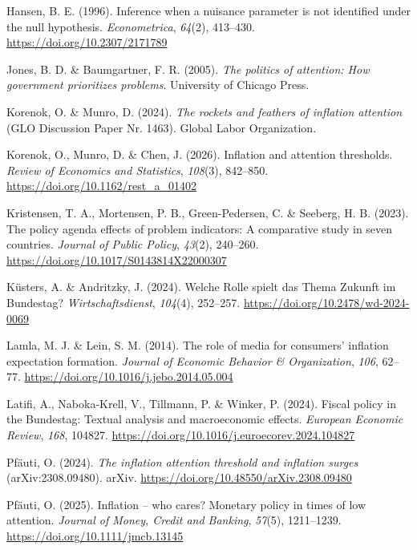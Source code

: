 \documentclass[11pt,a4paper]{article}
\newenvironment{literatur}{\begin{list}{}{\setlength{\leftmargin}{1.5em}\setlength{\itemindent}{-1.5em}\setlength{\itemsep}{0.35em}\small}\raggedright}{\end{list}}
\begin{document}
\begin{literatur}
\item Hansen, B. E. (1996). Inference when a nuisance parameter is not identified under the null hypothesis. \emph{Econometrica}, \emph{64}(2), 413--430. \url{https://doi.org/10.2307/2171789}

\item Jones, B. D. \& Baumgartner, F. R. (2005). \emph{The politics of attention: How government prioritizes problems}. University of Chicago Press.

\item Korenok, O. \& Munro, D. (2024). \emph{The rockets and feathers of inflation attention} (GLO Discussion Paper Nr. 1463). Global Labor Organization.

\item Korenok, O., Munro, D. \& Chen, J. (2026). Inflation and attention thresholds. \emph{Review of Economics and Statistics}, \emph{108}(3), 842--850. \url{https://doi.org/10.1162/rest\_a\_01402}

\item Kristensen, T. A., Mortensen, P. B., Green-Pedersen, C. \& Seeberg, H. B. (2023). The policy agenda effects of problem indicators: A comparative study in seven countries. \emph{Journal of Public Policy}, \emph{43}(2), 240--260. \url{https://doi.org/10.1017/S0143814X22000307}

\item Küsters, A. \& Andritzky, J. (2024). Welche Rolle spielt das Thema Zukunft im Bundestag? \emph{Wirtschaftsdienst}, \emph{104}(4), 252--257. \url{https://doi.org/10.2478/wd-2024-0069}

\item Lamla, M. J. \& Lein, S. M. (2014). The role of media for consumers' inflation expectation formation. \emph{Journal of Economic Behavior \& Organization}, \emph{106}, 62--77. \url{https://doi.org/10.1016/j.jebo.2014.05.004}

\item Latifi, A., Naboka-Krell, V., Tillmann, P. \& Winker, P. (2024). Fiscal policy in the Bundestag: Textual analysis and macroeconomic effects. \emph{European Economic Review}, \emph{168}, 104827. \url{https://doi.org/10.1016/j.euroecorev.2024.104827}

\item Pfäuti, O. (2024). \emph{The inflation attention threshold and inflation surges} (arXiv:2308.09480). arXiv. \url{https://doi.org/10.48550/arXiv.2308.09480}

\item Pfäuti, O. (2025). Inflation -- who cares? Monetary policy in times of low attention. \emph{Journal of Money, Credit and Banking}, \emph{57}(5), 1211--1239. \url{https://doi.org/10.1111/jmcb.13145}


\end{literatur}
\end{document}
